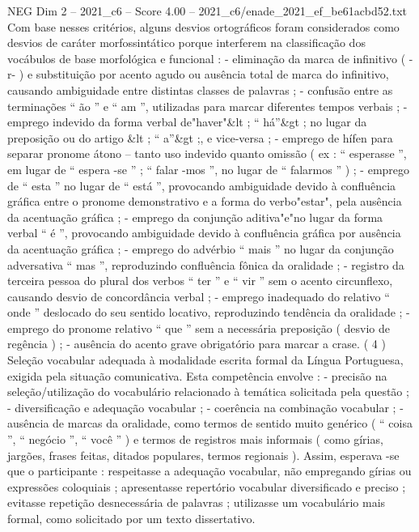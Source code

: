 \begin{textsample}{NEG Dim 2 – 2021\_c6 – Score 4.00 – 2021\_c6/enade\_2021\_ef\_be61acbd52.txt}
Com base nesses critérios, alguns desvios ortográficos foram considerados como desvios de caráter morfossintático porque interferem na classificação dos vocábulos de base morfológica e funcional : - eliminação da marca de infinitivo ( -r- ) e substituição por acento agudo ou ausência total de marca do infinitivo, causando ambiguidade entre distintas classes de palavras ; - confusão entre as terminações “ ão ” e “ am ”, utilizadas para marcar diferentes tempos verbais ; - emprego indevido da forma verbal de"haver"\&lt ; “ há”\&gt ; no lugar da preposição ou do artigo \&lt ; “ a”\&gt ;, e vice-versa ; - emprego de hífen para separar pronome átono – tanto uso indevido quanto omissão ( ex : “ esperasse ”, em lugar de “ espera -se ” ; “ falar -mos ”, no lugar de “ falarmos ” ) ; - emprego de “ esta ” no lugar de “ está ”, provocando ambiguidade devido à confluência gráfica entre o pronome demonstrativo e a forma do verbo"estar", pela ausência da acentuação gráfica ; - emprego da conjunção aditiva"e"no lugar da forma verbal “ é ”, provocando ambiguidade devido à confluência gráfica por ausência da acentuação gráfica ; - emprego do advérbio “ mais ” no lugar da conjunção adversativa “ mas ”, reproduzindo confluência fônica da oralidade ; - registro da terceira pessoa do plural dos verbos “ ter ” e “ vir ” sem o acento circunflexo, causando desvio de concordância verbal ; - emprego inadequado do relativo “ onde ” deslocado do seu sentido locativo, reproduzindo tendência da oralidade ; - emprego do pronome relativo “ que ” sem a necessária preposição ( desvio de regência ) ; - ausência do acento grave obrigatório para marcar a crase. ( 4 ) Seleção vocabular adequada à modalidade escrita formal da Língua Portuguesa, exigida pela situação comunicativa.
Esta competência envolve : - precisão na seleção/utilização do vocabulário relacionado à temática solicitada pela questão ; - diversificação e adequação vocabular ; - coerência na combinação vocabular ; - ausência de marcas da oralidade, como termos de sentido muito genérico ( “ coisa ”, “ negócio ”, “ você ” ) e termos de registros mais informais ( como gírias, jargões, frases feitas, ditados populares, termos regionais ).
Assim, esperava -se que o participante : respeitasse a adequação vocabular, não empregando gírias ou expressões coloquiais ; apresentasse repertório vocabular diversificado e preciso ; evitasse repetição desnecessária de palavras ; utilizasse um vocabulário mais formal, como solicitado por um texto dissertativo.

\end{textsample}
